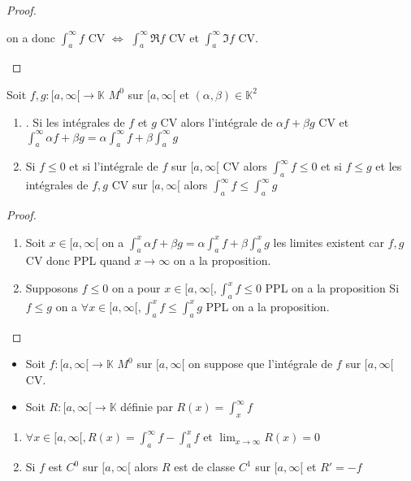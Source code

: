 \documentclass[11pt,hidelinks]{book}
\theoremstyle{mytheoremstyle}
\theoremstyle{mytheoremstyle}
\theoremstyle{mytheoremstyle}
\theoremstyle{mytheoremstyle}
\theoremstyle{mytheoremstyle}
\theoremstyle{mytheoremstyle}
\theoremstyle{mytheoremstyle}
\theoremstyle{mytheoremstyle}
\theoremstyle{myproblemstyle}
\def\mbb#1{\mathbb{#1}}
\def\ig#1{\int_{a}^{\infty} #1}
\def\bK{\mbb{K}}
\def\af{[a,\infty[}
\newcommand{\func}[3]{#1\colon#2\to#3}
\begin{document}
\begin{adjustwidth}{-2em}{-1em}
\begin{prop}
\begin{proof}
\begin{enumerate}
            on a donc $\int_{a}^{\infty} f$ CV $\Leftrightarrow$ $\int_{a}^{\infty} \Re f$ CV et $\int_{a}^{\infty} \Im f$ CV.
            \end{enumerate}
        \end{proof} 
    \end{prop}
    \begin{prop}
        Soit $\func{f,g}{\af}{\bK}$ $M^0$ sur $\af$ et $(\alpha, \beta) \in \bK^2$
        \begin{enumerate}
        \item. Si les intégrales de $f$ et $g$ CV alors l'intégrale de $\alpha f + \beta g$ CV 
        et $\int_{a}^{\infty} \alpha f + \beta g = \alpha \ig{f} + \beta \ig{g}$
         
        \item Si $f \leq 0$ et si l'intégrale de $f$ sur $\af$ CV alors $\ig{f} \leq 0$
        et si $f \leq g$ et les intégrales de $f,g$ CV sur $\af$ alors $\ig{f} \leq \ig{g}$
        \end{enumerate}
        \begin{proof}
            \begin{enumerate}
            \item Soit $x \in \af$ on a $\int_{a}^{x} \alpha f + \beta g = \alpha \int_{a}^{x} f + \beta \int_{a}^{x} g$
            les limites existent car $f,g$ CV donc PPL quand $x \to \infty$ on a la proposition.
         
            
            \item Supposons $f \leq 0$ on a pour $x \in \af, \int_{a}^{x} f \leq 0$ PPL on a la proposition 
            Si $f \leq g$ on a $\forall x \in \af, \int_{a}^{x} f \leq \int_{a}^{x} g$ PPL on a la proposition.
            \end{enumerate}
        \end{proof}
    \end{prop}
    \begin{theorem}
        \begin{itemize}[label=$\circ$]
        \item Soit $\func{f}{\af}{\bK}$ $M^0$ sur $\af$ on suppose que l'intégrale de $f$ sur $\af$ CV. 
        \item Soit $\func{R}{\af}{\bK}$ définie par $R(x) = \int_{x}^{\infty} f$ 
        \end{itemize}
        \begin{enumerate}
        \item $\forall x \in \af, R(x) = \ig{f} - \int_{a}^{x} f$ et $\lim_{x \to \infty} R(x) = 0$
        \item Si $f$ est $C^0$ sur $\af$ alors $R$ est de classe $C^1$ sur $\af$ et $R' = -f$
        

\end{enumerate}
\end{theorem}
\end{adjustwidth}
\end{document}
